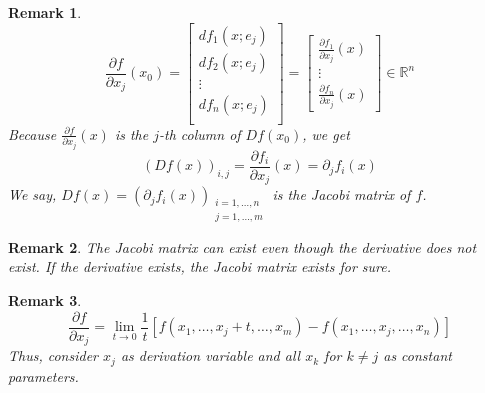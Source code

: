 \documentclass{article}
\newtheorem{remark}{Remark}  \numberwithin{remark}{section}
\begin{document}
\begin{remark}
  \[
    \frac{\partial f}{\partial x_j}(x_0) =
    \begin{bmatrix}
      df_1(x; e_j) \\
      df_2(x; e_j) \\
      \vdots \\
      df_n(x; e_j) \\
    \end{bmatrix}
    = \begin{bmatrix}
      \frac{\partial f_1}{\partial x_j}(x) \\
      \vdots \\
      \frac{\partial f_n}{\partial x_j}(x)
    \end{bmatrix}
    \in \mathbb R^n
  \]
  Because $\frac{\partial f}{\partial x_j}(x)$ is the $j$-th column of $Df(x_0)$,
  we get
  \[ \left(Df(x)\right)_{i,j} = \frac{\partial f_i}{\partial x_j}(x) = \partial_j f_i(x) \]
  We say, $Df(x) = (\partial_j f_i(x))_{\substack{i = 1,\dots,n \\ j = 1,\dots,m}}$ is the \emph{Jacobi matrix} of $f$.
\end{remark}

\begin{remark}
  The Jacobi matrix can exist even though the derivative does not exist.
  If the derivative exists, the Jacobi matrix exists for sure.
\end{remark}

\begin{remark}
  \[ \frac{\partial f}{\partial x_j} = \lim_{t\to0} \frac1t \left[f(x_1, \dots, x_j+t, \dots, x_m) - f(x_1, \dots, x_j, \dots, x_n)\right] \]
  Thus, consider $x_j$ as derivation variable and all $x_k$ for $k \neq j$ as constant parameters.
\end{remark}
\end{document}
